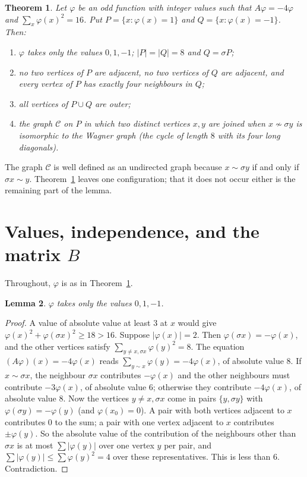 \documentclass[11pt,a4paper]{article}
\newtheorem{theorem}{Theorem}[section]
\newtheorem{lemma}[theorem]{Lemma}
\theoremstyle{remark}
\newcommand{\sg}{\sigma}
\begin{document}
\begin{theorem}\label{thm:A}
Let $\varphi$ be an odd function with integer values such that $A\varphi=-4\varphi$ and $\sum_x\varphi(x)^2=16$. Put
$P=\{x:\varphi(x)=1\}$ and $Q=\{x:\varphi(x)=-1\}$. Then:
\begin{enumerate}[label=\textup{(\alph*)}]
\item $\varphi$ takes only the values $0,1,-1$; $|P|=|Q|=8$ and $Q=\sg P$;
\item no two vertices of $P$ are adjacent, no two vertices of $Q$ are adjacent, and every vertex of $P$ has exactly
four neighbours in $Q$;
\item all vertices of $P\cup Q$ are outer;
\item the graph $\mathcal C$ on $P$ in which two distinct vertices $x,y$ are joined when $x\not\sim\sg y$ is
isomorphic to the Wagner graph (the cycle of length $8$ with its four long diagonals).
\end{enumerate}
\end{theorem}

The graph $\mathcal C$ is well defined as an undirected graph because $x\sim\sg y$ if and only if $\sg x\sim y$.
Theorem~\ref{thm:A} leaves one configuration; that it does not occur either is the remaining part of the lemma.

\section{Values, independence, and the matrix $B$}

Throughout, $\varphi$ is as in Theorem~\ref{thm:A}.

\begin{lemma}\label{lem:values}
$\varphi$ takes only the values $0,1,-1$.
\end{lemma}
\begin{proof}
A value of absolute value at least $3$ at $x$ would give $\varphi(x)^2+\varphi(\sg x)^2\ge18>16$. Suppose
$|\varphi(x)|=2$. Then $\varphi(\sg x)=-\varphi(x)$, and the other vertices satisfy
$\sum_{y\ne x,\sg x}\varphi(y)^2=8$. The equation $(A\varphi)(x)=-4\varphi(x)$ reads
$\sum_{y\sim x}\varphi(y)=-4\varphi(x)$, of absolute value $8$. If $x\sim\sg x$, the neighbour $\sg x$ contributes
$-\varphi(x)$ and the other neighbours must contribute $-3\varphi(x)$, of absolute value $6$; otherwise they
contribute $-4\varphi(x)$, of absolute value $8$. Now the vertices $y\ne x,\sg x$ come in pairs $\{y,\sg y\}$ with
$\varphi(\sg y)=-\varphi(y)$ (and $\varphi(x_0)=0$). A pair with both vertices adjacent to $x$ contributes $0$ to
the sum; a pair with one vertex adjacent to $x$ contributes $\pm\varphi(y)$. So the absolute value of the
contribution of the neighbours other than $\sg x$ is at most $\sum|\varphi(y)|$ over one vertex $y$ per pair, and
$\sum|\varphi(y)|\le\sum\varphi(y)^2=4$ over these representatives. This is less than $6$. Contradiction.
\end{proof}
\end{document}

